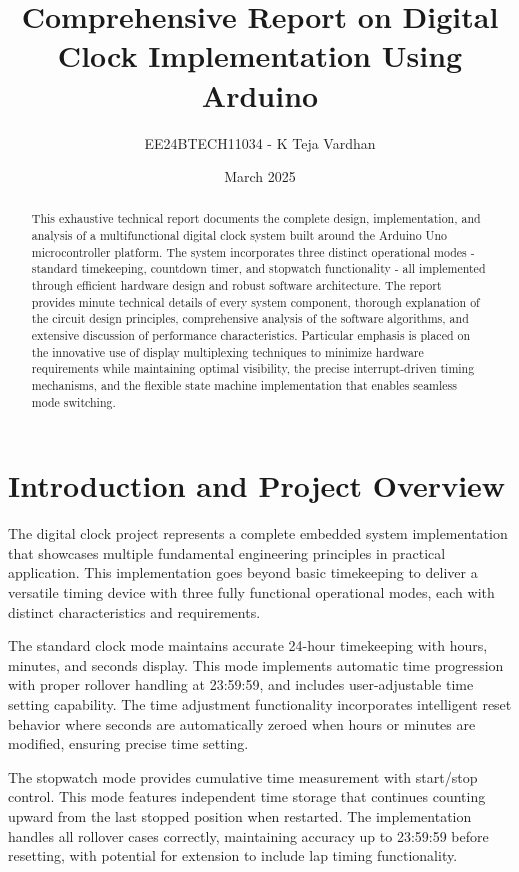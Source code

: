 \documentclass[a4paper,12pt]{article}
\title{Comprehensive Report on Digital Clock Implementation Using Arduino}
\author{EE24BTECH11034 - K Teja Vardhan}
\date{March 2025}
\begin{document}
\maketitle

\begin{abstract}
This exhaustive technical report documents the complete design, implementation, and analysis of a multifunctional digital clock system built around the Arduino Uno microcontroller platform. The system incorporates three distinct operational modes - standard timekeeping, countdown timer, and stopwatch functionality - all implemented through efficient hardware design and robust software architecture. The report provides minute technical details of every system component, thorough explanation of the circuit design principles, comprehensive analysis of the software algorithms, and extensive discussion of performance characteristics. Particular emphasis is placed on the innovative use of display multiplexing techniques to minimize hardware requirements while maintaining optimal visibility, the precise interrupt-driven timing mechanisms, and the flexible state machine implementation that enables seamless mode switching.
\end{abstract}

\newpage
\tableofcontents
\newpage  

\section{Introduction and Project Overview}
The digital clock project represents a complete embedded system implementation that showcases multiple fundamental engineering principles in practical application. This implementation goes beyond basic timekeeping to deliver a versatile timing device with three fully functional operational modes, each with distinct characteristics and requirements.

The standard clock mode maintains accurate 24-hour timekeeping with hours, minutes, and seconds display. This mode implements automatic time progression with proper rollover handling at 23:59:59, and includes user-adjustable time setting capability. The time adjustment functionality incorporates intelligent reset behavior where seconds are automatically zeroed when hours or minutes are modified, ensuring precise time setting.

The stopwatch mode provides cumulative time measurement with start/stop control. This mode features independent time storage that continues counting upward from the last stopped position when restarted. The implementation handles all rollover cases correctly, maintaining accuracy up to 23:59:59 before resetting, with potential for extension to include lap timing functionality.
\end{document}
